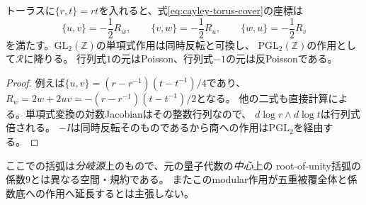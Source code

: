 \begin{proposition}[対数Poisson構造とmodular対称性]
\label{prop:ramification-log-poisson}
トーラスに$\{r,t\}=rt$を入れると、式\eqref{eq:cayley-torus-cover}の座標は
\[
 \{u,v\}=-\frac12 R_w,\qquad
 \{v,w\}=-\frac12 R_u,\qquad
 \{w,u\}=-\frac12 R_v
\]
を満たす。$\mathrm{GL}_2(\mathbb Z)$の単項式作用は同時反転と可換し、
$\mathrm{PGL}_2(\mathbb Z)$の作用として$\mathcal R$に降りる。
行列式$1$の元はPoisson、行列式$-1$の元は反Poissonである。
\end{proposition}
\begin{proof}
例えば$\{u,v\}=(r-r^{-1})(t-t^{-1})/4$であり、
$R_w=2w+2uv=-(r-r^{-1})(t-t^{-1})/2$となる。
他の二式も直接計算による。単項式変換の対数Jacobianはその整数行列なので、
$d\log r\wedge d\log t$は行列式倍される。
$-I$は同時反転そのものであるから商への作用は$\mathrm{PGL}_2$を経由する。
\end{proof}
ここでの括弧は\emph{分岐源}上のもので、元の量子代数の\emph{中心}上の
root-of-unity括弧の係数$9$とは異なる空間・規約である。
またこのmodular作用が五重被覆全体と係数底への作用へ延長するとは主張しない。

